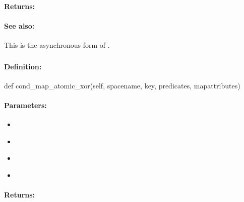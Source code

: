 \paragraph{Returns:}


\paragraph{See also:}  This is the asynchronous form of .

\pagebreak
\subsubsection{}
\label{api:python:cond_map_atomic_xor}


\paragraph{Definition:}
\begin{pythoncode}
def cond_map_atomic_xor(self, spacename, key, predicates, mapattributes)
\end{pythoncode}

\paragraph{Parameters:}
\begin{itemize}[noitemsep]
\item {}\\

\item {}\\

\item {}\\

\item {}\\

\end{itemize}

\paragraph{Returns:}


